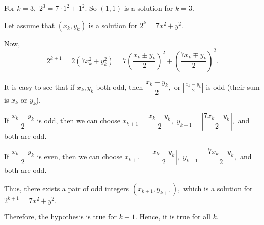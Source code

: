 \documentclass{article}
\begin{document}
\begin{soln}
    For $k=3,$ $2^3 = 7 \cdot 1^2 + 1^2.$ So $(1,1)$ is a solution for $k=3.$

    Let assume that $(x_k, y_k)$ is a solution for $2^k = 7x^2 + y^2.$

    Now,
    \[
        2^{k+1} = 2(7x_k^2 + y_k^2)= 7\left(\frac{x_k \pm y_k}{2}\right)^2 + \left(\frac{7x_k \mp y_k}{2}\right)^2.
    \]

    It is easy to see that if $x_k, y_k$ both odd, then $\dfrac{x_k + y_k}{2},$ or $\left| \frac{x_k - y_k}{2} \right|$ is odd (their sum is $x_k$ or $y_k$).

    If $\dfrac{x_k + y_k}{2}$ is odd, then we can choose $x_{k+1} = \dfrac{x_k + y_k}{2},$ $y_{k+1} = \left| \dfrac{7x_k - y_k}{2} \right|,$ and both are odd.
    
    If $\dfrac{x_k + y_k}{2}$ is even, then we can choose $x_{k+1} = \left| \dfrac{x_k - y_k}{2} \right|,$ $y_{k+1} = \dfrac{7x_k + y_k}{2},$ and both are odd.

    Thus, there exists a pair of odd integers $(x_{k+1}, y_{k+1}),$ which is a solution for $2^{k+1} = 7x^2 + y^2.$
    
    Therefore, the hypothesis is true for $k+1.$ Hence, it is true for all $k$.
\end{soln}
\end{document}
